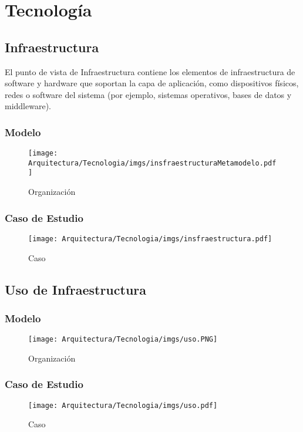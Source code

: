 \chapter{Tecnología}

\section{Infraestructura}
El punto de vista de Infraestructura contiene los elementos de infraestructura de software y hardware que soportan la capa de aplicación, como dispositivos físicos, redes o software del sistema (por ejemplo, sistemas operativos, bases de datos y middleware).
\subsection{Modelo}
\begin{figure}[h!]
	\centering
	\texttt{[image: Arquitectura/Tecnologia/imgs/insfraestructuraMetamodelo.pdf]}
	\caption{Organización}
\end{figure}
\newpage
\subsection{Caso de Estudio}

\begin{figure}[h!]
	\centering
	\texttt{[image: Arquitectura/Tecnologia/imgs/insfraestructura.pdf]}
	\caption{Caso}
\end{figure}

\newpage

\section{Uso de Infraestructura}
\subsection{Modelo}
\begin{figure}[h!]
	\centering
	\texttt{[image: Arquitectura/Tecnologia/imgs/uso.PNG]}
	\caption{Organización}
\end{figure}
\newpage
\subsection{Caso de Estudio}

\begin{figure}[h!]
	\centering
	\texttt{[image: Arquitectura/Tecnologia/imgs/uso.pdf]}
	\caption{Caso}
\end{figure}

